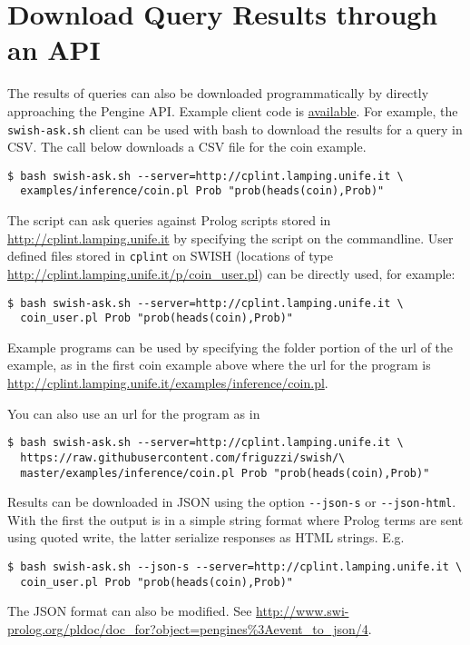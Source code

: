 \documentclass[a4paper,10pt]{scrartcl}
\begin{document}


\section{Download Query Results through an API}
The results of queries can also be downloaded programmatically by directly
approaching the Pengine API. Example client code is 
\href{https://github.com/friguzzi/swish/tree/master/client}{available}.  For example, the \verb|swish-ask.sh| client
can be used with bash to download the results for a query in CSV.  The call
below downloads a CSV file for the coin example.
\begin{verbatim}
$ bash swish-ask.sh --server=http://cplint.lamping.unife.it \   
  examples/inference/coin.pl Prob "prob(heads(coin),Prob)"
\end{verbatim}
The script can ask queries against Prolog scripts stored in 
\url{http://cplint.lamping.unife.it} by specifying
the script on the commandline.  User defined files stored
in \texttt{cplint} on SWISH (locations of type
\url{http://cplint.lamping.unife.it/p/coin_user.pl}) can
be directly used, for example:
\begin{verbatim}
$ bash swish-ask.sh --server=http://cplint.lamping.unife.it \
  coin_user.pl Prob "prob(heads(coin),Prob)"
\end{verbatim}
Example programs can be used by specifying the folder portion of the url of the example,
as in the first coin example above where the url for the program is 
\url{http://cplint.lamping.unife.it/examples/inference/coin.pl}.

You can also use an url for the program as in 
\begin{verbatim}
$ bash swish-ask.sh --server=http://cplint.lamping.unife.it \
  https://raw.githubusercontent.com/friguzzi/swish/\  
  master/examples/inference/coin.pl Prob "prob(heads(coin),Prob)"
\end{verbatim}
Results can be downloaded in JSON using the option \verb|--json-s| or
\verb|--json-html|.
With the first the output is in a simple string format where Prolog terms are sent using quoted write, the latter serialize responses as HTML strings. E.g.
\begin{verbatim}
$ bash swish-ask.sh --json-s --server=http://cplint.lamping.unife.it \
  coin_user.pl Prob "prob(heads(coin),Prob)"
\end{verbatim}
The JSON format can also be modified. See
\url{http://www.swi-prolog.org/pldoc/doc_for?object=pengines%3Aevent_to_json/4}.
\end{document}
